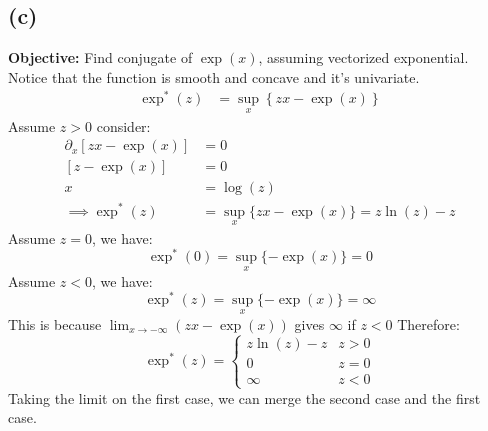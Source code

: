 \documentclass[]{article}
\begin{document}
    \subsection*{(c)}
        \textbf{Objective: }Find conjugate of $\exp(x)$, assuming vectorized exponential. Notice that the function is smooth and concave and it's univariate. 
        \begin{align*}\tag{1c1}\label{eqn:1c1}
            \exp^*(z) &= \sup_{x} \left\lbrace
            zx - \exp(x)
            \right\rbrace
        \end{align*}
        Assume $z > 0$ consider: 
        \begin{align*}\tag{1c2}\label{eqn:1c2}
            \partial_x[zx - \exp(x)] &= 0
            \\
            [z - \exp(x)] &= 0
            \\
            x &= \log(z)
            \\
            \implies  \exp^*(z) &= \sup_{x} \{zx - \exp(x)\} = z\ln(z) - z
        \end{align*}
        Assume $z = 0$, we have: 
        \begin{equation*}\tag{1c3}\label{eqn:1c3}
            \exp^*(0) = \sup_x \{- \exp(x)\} = 0
        \end{equation*}
        Assume $z < 0$, we have: 
        \begin{equation*}\tag{1c4}\label{eqn:1c4}
            \exp^*(z) = \sup_x \{- \exp(x)\} = \infty
        \end{equation*}
        This is because $\lim_{x\rightarrow -\infty} (zx - \exp(x))$ gives $\infty$ if $z < 0$
        Therefore:
        $$
            \exp^*(z) = \begin{cases}
                z\ln(z) - z & z > 0
                \\
                0 & z = 0 
                \\
                \infty & z < 0
            \end{cases}
        $$
        Taking the limit on the first case, we can merge the second case and the first case. 
\end{document}
